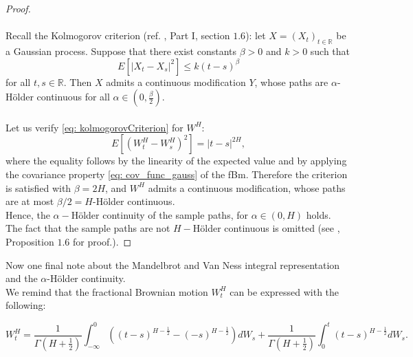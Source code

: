 \documentclass[a4paper,italian,11pt]{book}
\theoremstyle{plain}
\theoremstyle{remark}
\theoremstyle{plain}
\begin{document}
\begin{proof}
\\\
\\
Recall the Kolmogorov criterion (ref. \cite{ZhangBook}, Part I, section $1.6$):
let $X=(X_t)_{t\in \mathbb{R}}$ be a Gaussian process. Suppose that there exist constants $\beta>0$ and $k>0$ such that
\begin{equation}
    \label{eq: kolmogorovCriterion}
    E[|X_t - X_s|^2]\le k(t-s)^{\beta}
\end{equation}
for all $t,s\in \mathbb{R}$. Then $X$ admits a continuous modification $Y$, whose paths are $\alpha$-Hölder continuous for all $\alpha\in(0,\frac{\beta}{2})$.
\\
\\
Let us verify \eqref{eq: kolmogorovCriterion} for $W^H$:
\begin{equation}
    \label{eq: provingSamplePaths}
    E[(W^H_t -W^H_s)^2] = |t-s|^{2H},
\end{equation}
where the equality follows by the linearity of the expected value and by applying the covariance property \eqref{eq: cov_func_gauss} of the fBm. Therefore the criterion is satisfied with $\beta = 2H$, and $W^H$ admits a continuous modification, whose paths are at most $\beta/2=H$-Hölder continuous.\\
Hence, the $\alpha-$Hölder continuity of the sample paths, for $\alpha\in (0,H)$ holds. \\
The fact that the sample paths are not $H-$Hölder continuous is omitted (see \cite{NourdinIvan}, Proposition $1.6$ for proof.).

\end{proof}

Now one final note about the Mandelbrot and Van Ness integral representation and the $\alpha$-Hölder continuity. \\
We remind that the fractional Brownian motion $W^H_t$ can be expressed with the following:

\begin{equation}
\label{eq: refForKernelControlsReg}
    W_t^H= \frac{1}{\Gamma(H+\frac{1}{2})} \int_{-\infty}^0((t-s)^{H-\frac{1}{2}} - (-s)^{H-\frac{1}{2}})dW_s + \frac{1}{\Gamma(H+\frac{1}{2})} \int_0^t(t-s)^{H-\frac{1}{2}}dW_s.
\end{equation}
\end{document}
